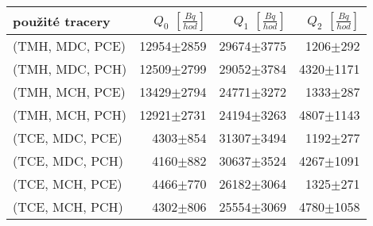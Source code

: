 \begin{tabular}{lrrr}
\toprule
použité tracery & $Q_0$ $\left[\si{\frac{Bq}{hod}}\right]$ & $Q_1$ $\left[\si{\frac{Bq}{hod}}\right]$ & $Q_2$ $\left[\si{\frac{Bq}{hod}}\right]$ \\
\midrule
(TMH, MDC, PCE) &                             12954$\pm$2859 &                             29674$\pm$3775 &                               1206$\pm$292 \\
(TMH, MDC, PCH) &                             12509$\pm$2799 &                             29052$\pm$3784 &                              4320$\pm$1171 \\
(TMH, MCH, PCE) &                             13429$\pm$2794 &                             24771$\pm$3272 &                               1333$\pm$287 \\
(TMH, MCH, PCH) &                             12921$\pm$2731 &                             24194$\pm$3263 &                              4807$\pm$1143 \\
(TCE, MDC, PCE) &                               4303$\pm$854 &                             31307$\pm$3494 &                               1192$\pm$277 \\
(TCE, MDC, PCH) &                               4160$\pm$882 &                             30637$\pm$3524 &                              4267$\pm$1091 \\
(TCE, MCH, PCE) &                               4466$\pm$770 &                             26182$\pm$3064 &                               1325$\pm$271 \\
(TCE, MCH, PCH) &                               4302$\pm$806 &                             25554$\pm$3069 &                              4780$\pm$1058 \\
\bottomrule
\end{tabular}
